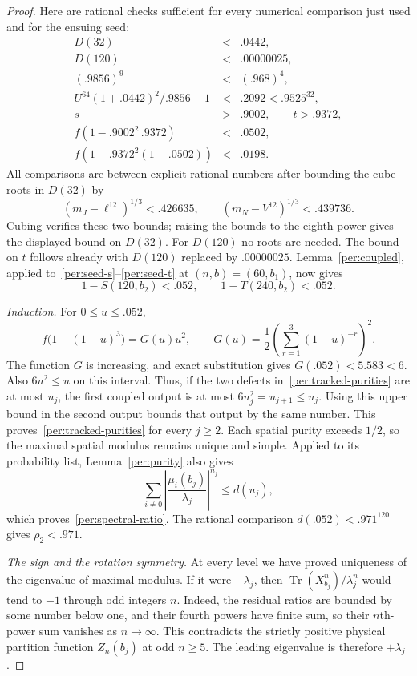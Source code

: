 \documentclass[11pt]{article}
\theoremstyle{remark}
\numberwithin{equation}{section}
\begin{document}
\begin{proof}
Here are rational checks sufficient for every numerical comparison
just used and for the ensuing seed:
\begin{equation}\label{per:scalar-checks}
\begin{array}{rcl}
 D(32)&<&.0442,\\
 D(120)&<&.00000025,\\
 (.9856)^9&<&(.968)^4,\\
 U^{64}(1+.0442)^2/.9856-1&<&.2092<.9525^{32},\\
 s&>&.9002,\qquad t>.9372,\\
 f(1-.9002^2\,.9372)&<&.0502,\\
 f(1-.9372^2(1-.0502))&<&.0198.
\end{array}
\end{equation}
All comparisons are between explicit rational numbers after bounding
the cube roots in $D(32)$ by
\[
 (m_J-\ell^{12})^{1/3}<.426635,\qquad
 (m_N-V^{12})^{1/3}<.439736.
\]
Cubing verifies these two bounds; raising the bounds to the eighth
power gives the displayed bound on $D(32)$.  For $D(120)$ no roots
are needed.  The bound on $t$ follows already with
$D(120)$ replaced by $.00000025$.
Lemma~\ref{per:coupled}, applied to~\eqref{per:seed-s}--\eqref{per:seed-t}
at $(n,b)=(60,b_1)$, now gives
\[
 1-S(120,b_2)<.052,\qquad 1-T(240,b_2)<.052.
\]

\emph{Induction.}
For $0\le u\le .052$,
\begin{equation}\label{per:G}
 f\bigl(1-(1-u)^3\bigr)=G(u)u^2,\qquad
 G(u)=\frac12\left(\sum_{r=1}^3(1-u)^{-r}\right)^2.
\end{equation}
The function $G$ is increasing, and exact substitution gives
$G(.052)<5.583<6$.  Also $6u^2\le u$ on this interval.
Thus, if the two defects in~\eqref{per:tracked-purities} are at most
$u_j$, the first coupled output is at most $6u_j^2=u_{j+1}\le u_j$.
Using this upper bound in the second output bounds that output by the
same number.  This proves~\eqref{per:tracked-purities} for every
$j\ge2$.  Each spatial purity exceeds $1/2$, so the maximal spatial
modulus remains unique and simple.  Applied to its probability list,
Lemma~\ref{per:purity} also gives
\[
 \sum_{i\ne0}\left|\frac{\mu_i(b_j)}{\lambda_j}\right|^{n_j}
 \le d(u_j),
\]
which proves~\eqref{per:spectral-ratio}.
The rational comparison $d(.052)<.971^{120}$ gives $\rho_2<.971$.

\emph{The sign and the rotation symmetry.}
At every level we have proved uniqueness of the eigenvalue of maximal
modulus.  If it were $-\lambda_j$, then
$\operatorname{Tr}(X_{b_j}^n)/\lambda_j^n$ would tend to $-1$ through odd integers
$n$.  Indeed, the residual ratios are bounded by some number below one,
and their fourth powers have finite sum, so their $n$th-power sum
vanishes as $n\to\infty$.  This contradicts the strictly positive
physical partition function $Z_n(b_j)$ at odd $n\ge5$.
The leading eigenvalue is therefore $+\lambda_j$.


\end{proof}
\end{document}

